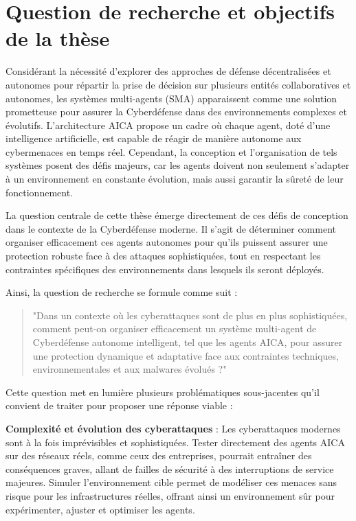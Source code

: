 \section{Question de recherche et objectifs de la thèse}

Considérant la nécessité d'explorer des approches de défense décentralisées et autonomes pour répartir la prise de décision sur plusieurs entités collaboratives et autonomes, les systèmes multi-agents (SMA) apparaissent comme une solution prometteuse pour assurer la Cyberdéfense dans des environnements complexes et évolutifs. L'architecture AICA propose un cadre où chaque agent, doté d'une intelligence artificielle, est capable de réagir de manière autonome aux cybermenaces en temps réel. Cependant, la conception et l'organisation de tels systèmes posent des défis majeurs, car les agents doivent non seulement s'adapter à un environnement en constante évolution, mais aussi garantir la sûreté de leur fonctionnement.

La question centrale de cette thèse émerge directement de ces défis de conception dans le contexte de la Cyberdéfense moderne. Il s'agit de déterminer comment organiser efficacement ces agents autonomes pour qu'ils puissent assurer une protection robuste face à des attaques sophistiquées, tout en respectant les contraintes spécifiques des environnements dans lesquels ils seront déployés.

Ainsi, la question de recherche se formule comme suit :

\begin{quote}
    "Dans un contexte où les cyberattaques sont de plus en plus sophistiquées, comment peut-on organiser efficacement un système multi-agent de Cyberdéfense autonome intelligent, tel que les agents AICA, pour assurer une protection dynamique et adaptative face aux contraintes techniques, environnementales et aux malwares évolués ?"
\end{quote}

Cette question met en lumière plusieurs problématiques sous-jacentes qu'il convient de traiter pour proposer une réponse viable :

\textbf{Complexité et évolution des cyberattaques} : Les cyberattaques modernes sont à la fois imprévisibles et sophistiquées. Tester directement des agents AICA sur des réseaux réels, comme ceux des entreprises, pourrait entraîner des conséquences graves, allant de failles de sécurité à des interruptions de service majeures. Simuler l'environnement cible permet de modéliser ces menaces sans risque pour les infrastructures réelles, offrant ainsi un environnement sûr pour expérimenter, ajuster et optimiser les agents.

